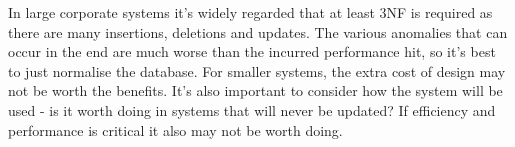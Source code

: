 \documentclass{article}
\begin{document}
	\par In large corporate systems it's widely regarded that at least 3NF is required as there are many insertions, deletions and updates. The various anomalies that can occur in the end are much worse than the incurred performance hit, so it's best to just normalise the database. For smaller systems, the extra cost of design may not be worth the benefits. It's also important to consider how the system will be used - is it worth doing in systems that will never be updated? If efficiency and performance is critical it also may not be worth doing.
		
	
\end{document}
